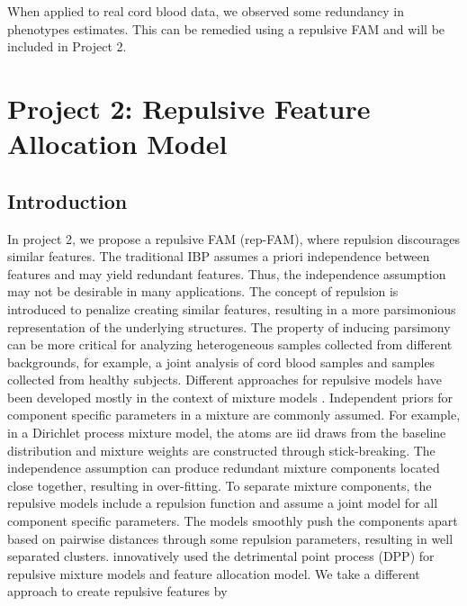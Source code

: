 \documentclass[12pt,]{article}
\begin{document}
When applied to real cord blood data, we observed some redundancy in phenotypes
estimates. This can be remedied using a repulsive FAM and will be included in
Project 2.






\section{Project 2: Repulsive Feature Allocation Model}\label{sec:proj2}
\subsection{Introduction}
In project 2, we propose a repulsive FAM (rep-FAM), where repulsion discourages
similar features. The traditional IBP assumes a priori independence between
features and may yield redundant features. Thus, the independence assumption
may not be desirable in many applications.  The concept of repulsion is
introduced to penalize creating similar features, resulting in a more
parsimonious representation of the underlying structures.  The property of
inducing parsimony can be more critical for analyzing heterogeneous samples
collected from different backgrounds, for example, a joint analysis of cord
blood samples and samples collected from healthy subjects.  Different
approaches for repulsive models have been developed mostly in the context of
mixture models \citep{petralia2012repulsive, quinlan2017parsimonious,
xie2017bayesian, quinlan2017density}.  Independent priors for component
specific parameters in a mixture are commonly assumed. For example, in a
Dirichlet process mixture model, the atoms are iid draws from the baseline
distribution and mixture weights are constructed through stick-breaking. The
independence assumption can produce redundant mixture components located close
together, resulting in over-fitting.  To separate mixture components, the
repulsive models include a repulsion function and assume a joint model for all
component specific parameters.  The models smoothly push the components apart
based on pairwise distances through some repulsion parameters, resulting in
well separated clusters.  \cite{xu2016bayesian} innovatively used the
detrimental point process (DPP) for repulsive mixture models and feature
allocation model.  We take a different approach to create repulsive features by
\end{document}
